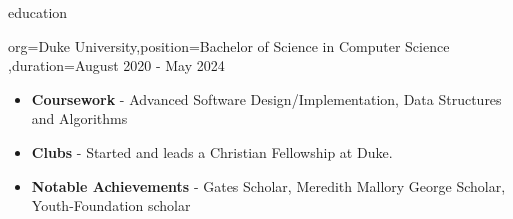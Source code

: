 \documentclass{resume}
\begin{document}
\makeheader

\newcommand{\skill}[2]{\textbf{#1} - #2}

\begin{ResumeSection}{education}
    \begin{ResumeSubsection}{org={Duke University},position={Bachelor of Science in Computer Science}
        ,duration={August 2020 - May 2024}}
        \begin{itemize}
            \item \skill{Coursework}{
                    Advanced Software Design/Implementation, 
                     Data Structures and Algorithms
            }
            \item \skill{Clubs}{Started and leads a Christian
                Fellowship at Duke.}
            \item \skill{Notable Achievements}{Gates Scholar, Meredith Mallory
                George Scholar, Youth-Foundation scholar}
        \end{itemize}
    \end{ResumeSubsection}
\end{ResumeSection}
\end{document}
